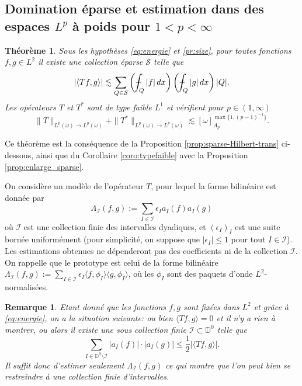 \documentclass[11pt]{amsart}
\newtheorem{theorem}{Th\'eor\`eme}
\newtheorem*{remark}{Remarque}
\newcommand{\ii}{\mathscr}
\newcommand{\mcS}{{\mathcal S}}
\newcommand{\Dy}{{\mathbb D}}
\def\Xint#1{\mathchoice
   {\XXint\displaystyle\textstyle{#1}}%
   {\XXint\textstyle\scriptstyle{#1}}%
   {\XXint\scriptstyle\scriptscriptstyle{#1}}%
   {\XXint\scriptscriptstyle\scriptscriptstyle{#1}}%
   \!\int}
\def\XXint#1#2#3{{\setbox0=\hbox{$#1{#2#3}{\int}$}
     \vcenter{\hbox{$#2#3$}}\kern-.5\wd0}}
\def\aver#1{\Xint-_{#1}}
\begin{document}
\subsection{Domination \'eparse et estimation dans des espaces $L^p$ \`a poids pour $1<p<\infty$} \label{subsec:p>1}

\begin{theorem} \label{thm:p>1} Sous les hypoth\`eses \eqref{eq:energie} et \eqref{pr:size}, pour toutes fonctions $f,g\in L^2$ il existe une collection \'eparse $\mcS$ telle que
$$ \left| \langle Tf, g \rangle \right| \lesssim \sum_{Q\in \mcS} \left(\aver{Q} |f| \, dx \right) \left(\aver{Q} |g| \, dx \right) |Q|.$$ 
Les op\'erateurs $T$ et $T^*$ sont de type faible $L^1$ et v\'erifient pour $p\in(1,\infty)$
$$ \| T\|_{L^p(\omega) \to L^p(\omega)} + \| T^*\|_{L^p(\omega) \to L^p(\omega)} \lesssim [\omega]_{A_p}^{\max\{1,(p-1)^{-1}\}}.$$
\end{theorem}

Ce th\'eor\`eme est la cons\'equence de la Proposition \ref{prop:sparse-Hilbert-trans} ci-dessous, ainsi que du Corollaire \ref{coro:typefaible} avec la Proposition \ref{prop:enlarge_sparse}. 

On consid\`ere un mod\`ele de l'op\'erateur $T$, pour lequel la forme bilin\'eaire est donn\'ee par
\[
\Lambda_\ii I (f, g):=\sum_{I \in \ii I } \epsilon_I a_I(f) a_I(g)
\]
o\`u $\ii I$ est une collection finie des intervalles dyadiques, et $(\epsilon_I)_I$ est une suite born\'ee uniform\'ement (pour simplicit\'e, on suppose que $\vert \epsilon_I \vert \leq 1$ pour tout $I \in \ii I$). Les estimations obtenues ne d\'ependeront pas des coefficients ni de la collection $\ii I$. On rappelle que le prototype est celui de la forme bilin\'eaire $\Lambda_\ii I (f, g):=\sum_{I \in \ii I } \epsilon_I\langle f, \phi_I \rangle \langle g, \phi_I \rangle$, o\`u les $\phi_I$ sont des paquets d'onde $L^2$-normalis\'ees.

\begin{remark} Etant donn\'e que les fonctions $f,g$ sont fix\'ees dans $L^2$ et gr\^ace \`a \eqref{eq:energie}, on a la situation suivante: ou bien $\langle Tf, g \rangle=0$ et il n'y a rien \`a montrer, ou alors il existe une sous collection finie $\ii I \subset \Dy^0$ telle que
$$ \sum_{I\in \Dy^0 \setminus \ii I} |a_I(f)| \cdot |a_I(g)| \leq \frac{1}{2} |\langle Tf, g \rangle|.$$
Il suffit donc d'estimer seulement $\Lambda_{\ii I}(f,g)$ ce qui montre que l'on peut bien se restreindre \`a une collection finie d'intervalles.
\end{remark}
\end{document}

